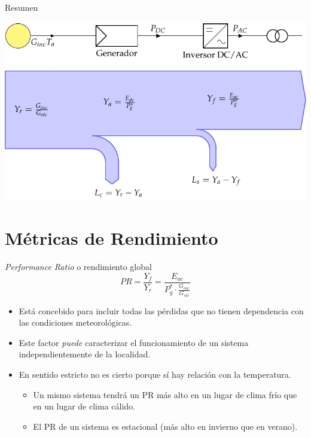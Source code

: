 \documentclass[aspectratio=169, usenames,svgnames,dvipsnames]{beamer}
\begin{document}
\begin{frame}[label={sec:orgac11f86}]{Resumen}
\begin{center}
\includegraphics[height=0.9\textheight]{../figs/SankeyDiagrama_SFCR.pdf}
\end{center}
\end{frame}

\section{Métricas de Rendimiento}
\label{sec:org7f4421f}

\begin{frame}[label={sec:org896e582}]{\emph{Performance Ratio} o rendimiento global}
\[
  PR = \frac{Y_f}{Y_r} = \frac{E_{ac}}{P_g^* \cdot \frac{G_{inc}}{G_{stc}}}
\]

\begin{itemize}
\item Está concebido para incluir todas las \alert{pérdidas que no tienen
dependencia con las condiciones meteorológicas}.

\item Este factor \emph{puede} caracterizar el funcionamiento de un sistema
\alert{independientemente de la localidad}.

\item En sentido estricto no es cierto porque sí hay \alert{relación con la temperatura}.

\begin{itemize}
\item Un mismo sistema tendrá un PR más alto en un lugar de clima frío que en un lugar de clima cálido.

\item El PR de un sistema es estacional (más alto en invierno que en verano).
\end{itemize}
\end{itemize}
\end{frame}
\end{document}
